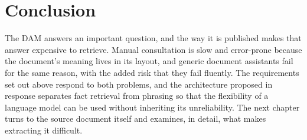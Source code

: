 \section*{Conclusion}

The DAM answers an important question, and the way it is published makes that answer expensive to retrieve. Manual consultation is slow and error-prone because the document's meaning lives in its layout, and generic document assistants fail for the same reason, with the added risk that they fail fluently. The requirements set out above respond to both problems, and the architecture proposed in response separates fact retrieval from phrasing so that the flexibility of a language model can be used without inheriting its unreliability. The next chapter turns to the source document itself and examines, in detail, what makes extracting it difficult.
